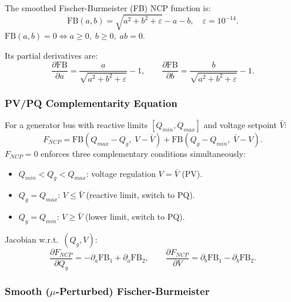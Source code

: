 The smoothed Fischer-Burmeister (FB) NCP function is:
\begin{equation}
  \mathrm{FB}(a, b) = \sqrt{a^2 + b^2 + \varepsilon} - a - b, \quad \varepsilon = 10^{-14}.
\end{equation}
$\mathrm{FB}(a, b) = 0 \iff a \geq 0,\; b \geq 0,\; ab = 0$.

Its partial derivatives are:
\begin{equation}
  \frac{\partial \mathrm{FB}}{\partial a} = \frac{a}{\sqrt{a^2+b^2+\varepsilon}} - 1, \qquad
  \frac{\partial \mathrm{FB}}{\partial b} = \frac{b}{\sqrt{a^2+b^2+\varepsilon}} - 1.
\end{equation}

\subsubsection{PV/PQ Complementarity Equation}

For a generator bus with reactive limits $[Q_{min}, Q_{max}]$ and
voltage setpoint $\bar{V}$:
\begin{equation}
  F_{NCP} = \mathrm{FB}(Q_{max} - Q_g,\; V - \bar{V}) +
             \mathrm{FB}(Q_g - Q_{min},\; \bar{V} - V).
\end{equation}
$F_{NCP}=0$ enforces three complementary conditions simultaneously:
\begin{itemize}
  \item $Q_{min} < Q_g < Q_{max}$: voltage regulation $V = \bar{V}$ (PV).
  \item $Q_g = Q_{max}$: $V \leq \bar{V}$ (reactive limit, switch to PQ).
  \item $Q_g = Q_{min}$: $V \geq \bar{V}$ (lower limit, switch to PQ).
\end{itemize}

Jacobian w.r.t.\ $(Q_g, V)$:
\begin{equation}
  \frac{\partial F_{NCP}}{\partial Q_g} = -\partial_a\mathrm{FB}_1 + \partial_a\mathrm{FB}_2, \qquad
  \frac{\partial F_{NCP}}{\partial V} = \partial_b\mathrm{FB}_1 - \partial_b\mathrm{FB}_2.
\end{equation}

\subsubsection{Smooth ($\mu$-Perturbed) Fischer-Burmeister}

